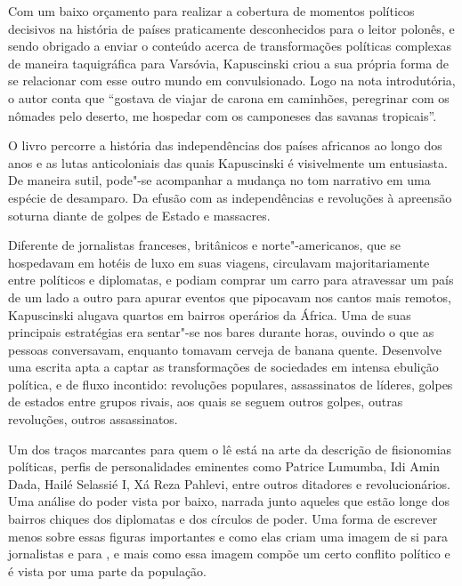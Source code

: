 Com um baixo orçamento para realizar a cobertura de momentos políticos
decisivos na história de países praticamente desconhecidos para o leitor
polonês, e sendo obrigado a enviar o conteúdo acerca de transformações
políticas complexas de maneira taquigráfica para Varsóvia, Kapuscinski
criou a sua própria forma de se relacionar com esse outro mundo em
convulsionado. Logo na nota introdutória, o autor conta que ``gostava de
viajar de carona em caminhões, peregrinar com os nômades pelo deserto,
me hospedar com os camponeses das savanas tropicais''.

O livro percorre a história das independências dos países africanos ao
longo dos anos e as lutas anticoloniais das quais Kapuscinski é
visivelmente um entusiasta. De maneira sutil, pode"-se acompanhar a
mudança no tom narrativo em uma espécie de desamparo. Da efusão com as
independências e revoluções à apreensão soturna diante de golpes de
Estado e massacres.

Diferente de jornalistas franceses, britânicos e norte"-americanos, que
se hospedavam em hotéis de luxo em suas viagens, circulavam
majoritariamente entre políticos e diplomatas, e podiam comprar um carro
para atravessar um país de um lado a outro para apurar eventos que
pipocavam nos cantos mais remotos, Kapuscinski alugava quartos em
bairros operários da África. Uma de suas principais estratégias era
sentar"-se nos bares durante horas, ouvindo o que as pessoas conversavam,
enquanto tomavam cerveja de banana quente. Desenvolve uma escrita apta a
captar as transformações de sociedades em intensa ebulição política, e
de fluxo incontido: revoluções populares, assassinatos de líderes,
golpes de estados entre grupos rivais, aos quais se seguem outros
golpes, outras revoluções, outros assassinatos.

Um dos traços marcantes para quem o lê está na arte da descrição de
fisionomias políticas, perfis de personalidades eminentes como Patrice
Lumumba, Idi Amin Dada, Hailé Selassié I, Xá Reza Pahlevi, entre outros
ditadores e revolucionários. Uma análise do poder vista por baixo,
narrada junto aqueles que estão longe dos bairros chiques dos diplomatas
e dos círculos de poder. Uma forma de escrever menos sobre essas figuras
importantes e como elas criam uma imagem de si para jornalistas e para
, e mais como essa imagem compõe um certo conflito político e é vista
por uma parte da população.

